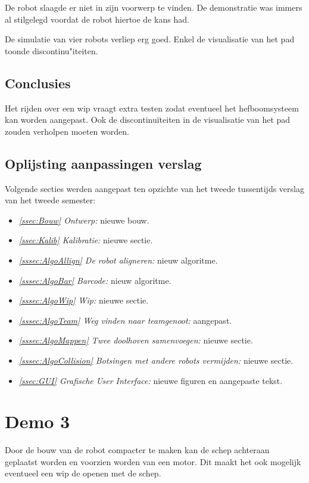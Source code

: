 \documentclass[eind]{penoverslag}
\begin{document}
De robot slaagde er niet in zijn voorwerp te vinden. De demonstratie was immers al stilgelegd voordat de robot hiertoe de kans had.

De simulatie van vier robots verliep erg goed. Enkel de visualisatie van het pad toonde discontinu"iteiten.

\subsection{Conclusies}
\label{Assec:conc2}
Het rijden over een wip vraagt extra testen zodat eventueel het hefboomsysteem kan worden aangepast. Ook de discontinu\"iteiten in de visualisatie van het pad zouden verholpen moeten worden.

\subsection{Oplijsting aanpassingen verslag}
\label{Assec:aanp2}
Volgende secties werden aangepast ten opzichte van het tweede tussentijds verslag van het tweede semester:

\begin{itemize}
\item \textit{\ref{ssec:Bouw} Ontwerp:} nieuwe bouw.
\item \textit{\ref{ssec:Kalib} Kalibratie:} nieuwe sectie.
\item \textit{\ref{sssec:AlgoAllign} De robot aligneren:} nieuw algoritme.
\item \textit{\ref{sssec:AlgoBar} Barcode:} nieuw algoritme.
\item \textit{\ref{sssec:AlgoWip} Wip:} nieuwe sectie.
\item \textit{\ref{sssec:AlgoTeam} Weg vinden naar teamgenoot:} aangepast.
\item \textit{\ref{sssec:AlgoMappen} Twee doolhoven samenvoegen:} nieuwe sectie.
\item \textit{\ref{sssec:AlgoCollision} Botsingen met andere robots vermijden:} nieuwe sectie.
\item \textit{\ref{ssec:GUI} Grafische User Interface:} nieuwe figuren en aangepaste tekst.
\end{itemize}

\section{Demo 3}
\label{Asec:demo3}
Door de bouw van de robot compacter te maken kan de schep achteraan geplaatst worden en voorzien worden van een motor. Dit maakt het ook mogelijk eventueel een wip de openen met de schep.
\end{document}
